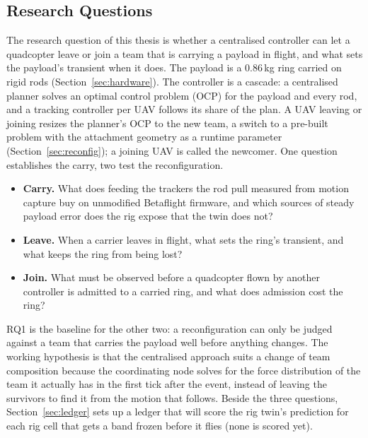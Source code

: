 
\subsection{Research Questions}
\label{sec:rq}

The research question of this thesis is whether a centralised controller can let a quadcopter leave or join
a team that is carrying a payload in flight, and what sets the payload's transient when it does. The payload
is a 0.86\,kg ring carried on rigid rods (Section~\ref{sec:hardware}). The controller is a cascade: a
centralised planner solves an optimal control problem (OCP) for the payload and every rod, and a tracking
controller per UAV follows its share of the plan. A UAV leaving or joining resizes the planner's OCP to the
new team, a switch to a pre-built problem with the attachment geometry as a runtime parameter
(Section~\ref{sec:reconfig}); a joining UAV is called the newcomer. One question establishes the carry, two
test the reconfiguration.
\begin{itemize}[leftmargin=3.6em, labelwidth=3.0em, labelsep=0.6em, align=left]
    \item[\textbf{RQ1}] \textbf{Carry.} What does feeding the trackers the rod pull measured from motion
    capture buy on unmodified Betaflight firmware, and which sources of steady payload error does the rig
    expose that the twin does not?
    \item[\textbf{RQ2}] \textbf{Leave.} When a carrier leaves in flight, what sets the ring's transient, and what
    keeps the ring from being lost?
    \item[\textbf{RQ3}] \textbf{Join.} What must be observed before a quadcopter flown by another controller is
    admitted to a carried ring, and what does admission cost the ring?
\end{itemize}
RQ1 is the baseline for the other two: a reconfiguration can only be judged against a team that carries the
payload well before anything changes. The working hypothesis is that the centralised approach suits a change
of team composition because the coordinating node solves for the force distribution of the team it actually
has in the first tick after the event, instead of leaving the survivors to find it from the motion that
follows. Beside the three questions, Section~\ref{sec:ledger} sets up a ledger that will score the rig twin's
prediction for each rig cell that gets a band frozen before it flies (none is scored yet).

